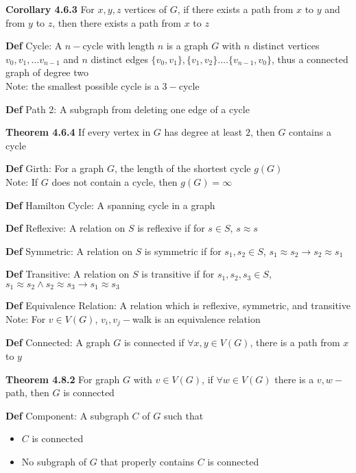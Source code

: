 \documentclass[11pt,notitlepage]{report}
\newcommand{\tbf}[1]{\textbf{#1}}
\begin{document}
\tbf{Corollary 4.6.3} For $x, y, z$ vertices of $G$, if there exists a path from $x$ to $y$ and from $y$ to $z$, then there exists a path from $x$ to $z$

\tbf{Def} Cycle: A $n-$cycle with length $n$ is a graph $G$ with $n$ distinct vertices $v_0, v_1, \dots v_{n-1}$ and $n$ distinct edges $\{v_0, v_1\}, \{v_1, v_2\}. \dots \{v_{n-1}, v_0\}$, thus a connected graph of degree two\\
\hspace*{5mm} Note: the smallest possible cycle is a $3-$cycle

\tbf{Def} Path 2: A subgraph from deleting one edge of a cycle 

\tbf{Theorem 4.6.4} If every vertex in $G$ has degree at least $2$, then $G$ contains a cycle

\tbf{Def} Girth: For a graph $G$, the length of the shortest cycle $g(G)$\\
\hspace*{5mm} Note: If $G$ does not contain a cycle, then $g(G) = \infty$

\tbf{Def} Hamilton Cycle: A spanning cycle in a graph

\tbf{Def} Reflexive: A relation on $S$ is reflexive if for $s \in S$, $s \approx s$

\tbf{Def} Symmetric: A relation on $S$ is symmetric if for $s_1, s_2 \in S$, $s_1 \approx s_2 \to s_2 \approx s_1$

\tbf{Def} Transitive: A relation on $S$ is transitive if for $s_1, s_2, s_3 \in S$, $s_1 \approx s_2 \wedge s_2 \approx s_3 \to s_1 \approx s_3$

\tbf{Def} Equivalence Relation: A relation which is reflexive, symmetric, and transitive\\
\hspace*{5mm} Note: For $v \in V(G)$, $v_i,v_j-$walk is an equivalence relation

\tbf{Def} Connected: A graph $G$ is connected if $\forall x, y \in V(G)$, there is a path from $x$ to $y$

\tbf{Theorem 4.8.2} For graph $G$ with $v \in V(G)$, if $\forall w \in V(G)$ there is a $v, w-$path, then $G$ is connected

\tbf{Def} Component: A subgraph $C$ of $G$ such that
\vspace{-3mm}
\begin{itemize}
    \item $C$ is connected
    \item No subgraph of $G$ that properly contains $C$ is connected
\end{itemize}
\vspace{-1mm}
\end{document}
